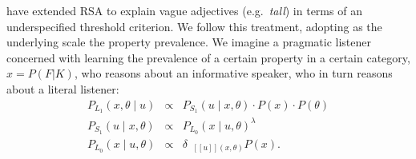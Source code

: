 \documentclass[10pt,letterpaper]{article}
\newcommand{\denote}[1]{\mbox{ $[\![ #1 ]\!]$}}
\newcommand{\mht}[1]{\textcolor{Blue}{[mht: #1]}}
\begin{document}
%
 have extended RSA to explain vague adjectives (e.g.~\emph{tall}) in terms of an underspecified threshold criterion. 
We follow this treatment, adopting as the underlying scale the property prevalence.
We imagine a pragmatic listener concerned with learning the prevalence of a certain property in a certain category, $x=P(F|K)$, who reasons about an informative speaker, who in turn reasons about a literal listener:
\begin{eqnarray}
P_{L_{1}}(x , \theta \mid u) &\propto& P_{S_{1}}(u \mid x, \theta) \cdot P(x) \cdot P(\theta) \label{eq:L1}\\
P_{S_{1}}(u \mid x, \theta) &\propto&  {P_{L_{0}}(x \mid u, \theta)}^{\lambda} \label{eq:S1}\\
P_{L_{0}}(x \mid u, \theta) &\propto& {\delta_{\denote{u}(x, \theta)} P(x)}. \label{eq:L0}
\end{eqnarray}


%
\end{document}
